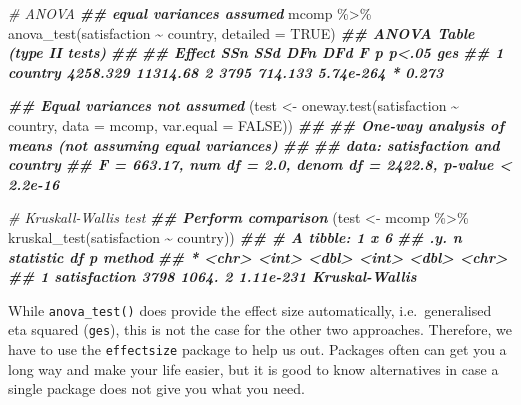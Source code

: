\documentclass[
]{book}
\newenvironment{Shaded}{\begin{snugshade}}{\end{snugshade}}
\newcommand{\AttributeTok}[1]{\textcolor[rgb]{0.77,0.63,0.00}{#1}}
\newcommand{\CommentTok}[1]{\textcolor[rgb]{0.56,0.35,0.01}{\textit{#1}}}
\newcommand{\ConstantTok}[1]{\textcolor[rgb]{0.00,0.00,0.00}{#1}}
\newcommand{\DocumentationTok}[1]{\textcolor[rgb]{0.56,0.35,0.01}{\textbf{\textit{#1}}}}
\newcommand{\FunctionTok}[1]{\textcolor[rgb]{0.00,0.00,0.00}{#1}}
\newcommand{\NormalTok}[1]{#1}
\newcommand{\OtherTok}[1]{\textcolor[rgb]{0.56,0.35,0.01}{#1}}
\newcommand{\SpecialCharTok}[1]{\textcolor[rgb]{0.00,0.00,0.00}{#1}}
\begin{document}
\begin{Shaded}
\begin{Highlighting}[]
\CommentTok{\# ANOVA}
\DocumentationTok{\#\# equal variances assumed}
\NormalTok{mcomp }\SpecialCharTok{\%\textgreater{}\%}
  \FunctionTok{anova\_test}\NormalTok{(satisfaction }\SpecialCharTok{\textasciitilde{}}\NormalTok{ country,}
              \AttributeTok{detailed =} \ConstantTok{TRUE}\NormalTok{)}
\DocumentationTok{\#\# ANOVA Table (type II tests)}
\DocumentationTok{\#\# }
\DocumentationTok{\#\#    Effect      SSn      SSd DFn  DFd       F         p p\textless{}.05   ges}
\DocumentationTok{\#\# 1 country 4258.329 11314.68   2 3795 714.133 5.74e{-}264     * 0.273}

\DocumentationTok{\#\# Equal variances not assumed}
\NormalTok{(test }\OtherTok{\textless{}{-}} \FunctionTok{oneway.test}\NormalTok{(satisfaction }\SpecialCharTok{\textasciitilde{}}\NormalTok{ country,}
            \AttributeTok{data =}\NormalTok{ mcomp,}
            \AttributeTok{var.equal =} \ConstantTok{FALSE}\NormalTok{))}
\DocumentationTok{\#\# }
\DocumentationTok{\#\#  One{-}way analysis of means (not assuming equal variances)}
\DocumentationTok{\#\# }
\DocumentationTok{\#\# data:  satisfaction and country}
\DocumentationTok{\#\# F = 663.17, num df = 2.0, denom df = 2422.8, p{-}value \textless{} 2.2e{-}16}

\CommentTok{\# Kruskall{-}Wallis test}
\DocumentationTok{\#\# Perform comparison}
\NormalTok{(test }\OtherTok{\textless{}{-}}\NormalTok{ mcomp }\SpecialCharTok{\%\textgreater{}\%}
  \FunctionTok{kruskal\_test}\NormalTok{(satisfaction }\SpecialCharTok{\textasciitilde{}}\NormalTok{ country))}
\DocumentationTok{\#\# \# A tibble: 1 x 6}
\DocumentationTok{\#\#   .y.              n statistic    df         p method        }
\DocumentationTok{\#\# * \textless{}chr\textgreater{}        \textless{}int\textgreater{}     \textless{}dbl\textgreater{} \textless{}int\textgreater{}     \textless{}dbl\textgreater{} \textless{}chr\textgreater{}         }
\DocumentationTok{\#\# 1 satisfaction  3798     1064.     2 1.11e{-}231 Kruskal{-}Wallis}
\end{Highlighting}
\end{Shaded}

While \texttt{anova\_test()} does provide the effect size automatically, i.e.~generalised eta squared (\texttt{ges}), this is not the case for the other two approaches. Therefore, we have to use the \texttt{effectsize} package to help us out. Packages often can get you a long way and make your life easier, but it is good to know alternatives in case a single package does not give you what you need.
\end{document}
